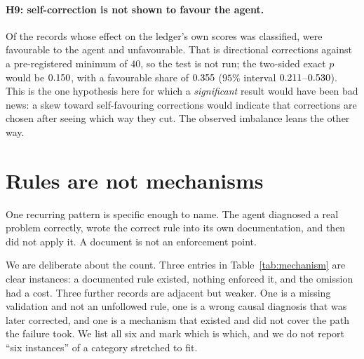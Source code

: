 \documentclass[11pt,a4paper]{article}
\begin{document}
\paragraph{H9: self-correction is not shown to favour the agent.} Of the
records whose effect on the ledger's own scores was classified, \EffFav{} were
favourable to the agent and \EffUnfav{} unfavourable. That is \EffN{}
directional corrections against a pre-registered minimum of $40$, so the test
is not run; the two-sided exact $p$ would be $0.150$, with a favourable share
of $0.355$ ($95\%$ interval $0.211$--$0.530$). This is the one
hypothesis here for which a \emph{significant} result would have been bad
news: a skew toward self-favouring corrections would indicate that corrections
are chosen after seeing which way they cut. The observed imbalance leans the
other way.

\section{Rules are not mechanisms}\label{sec:mechanism}

One recurring pattern is specific enough to name. The agent diagnosed a real
problem correctly, wrote the correct rule into its own documentation, and then
did not apply it. A document is not an enforcement point.

We are deliberate about the count. Three entries in Table~\ref{tab:mechanism}
are clear instances: a documented rule existed, nothing enforced it, and the
omission had a cost. Three further records are adjacent but weaker. One is a
missing validation and not an unfollowed rule, one is a wrong causal diagnosis
that was later corrected, and one is a mechanism that existed and did not
cover the path the failure took. We list all six and mark which is which, and
we do not report ``six instances'' of a category stretched to fit.
\end{document}
